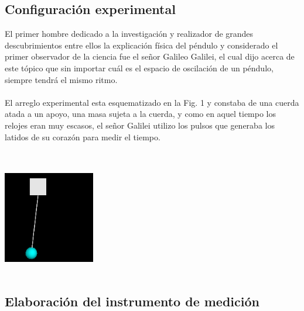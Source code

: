 \documentclass[12pt]{article}
\newenvironment{Figure}
{\par\medskip\noindent\minipage{\linewidth}}
{\endminipage\par\medskip}
\begin{document}
\begin{multicols}{2}
\section{Configuración experimental}
El primer hombre dedicado a la investigación\cite{GALILEO} y realizador de grandes descubrimientos entre ellos la explicación física del péndulo y considerado el primer observador de la ciencia fue el señor Galileo Galilei, el cual dijo acerca de este tópico que sin importar cuál es el espacio de oscilación de un péndulo, siempre tendrá el mismo ritmo. 
\\ \\
El arreglo experimental esta esquematizado en la Fig. 1 y constaba de una cuerda atada a un apoyo, una masa sujeta a la cuerda, y como en aquel tiempo los relojes eran muy escasos, el señor Galilei\cite{GALILEO} utilizo los pulsos que generaba los latidos de su corazón para medir el tiempo.
\\\\
\begin{Figure}
\center
\includegraphics[width=4.0cm, height=5cm] {fig/fig1.png}
\label{fig:g1}
\end{Figure}

\subsection{Elaboración del instrumento de medición}


\end{multicols}
\end{document}
